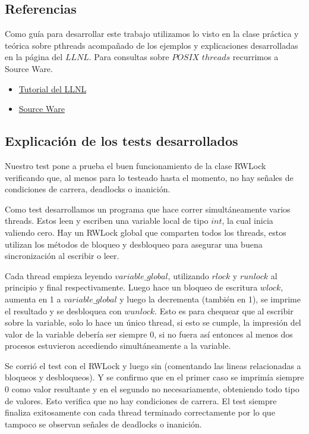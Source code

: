 \subsection{Referencias}

Como guía para desarrollar este trabajo utilizamos lo visto en la clase práctica y teórica sobre pthreads acompañado de los ejemplos y explicaciones desarrolladas en la página del $LLNL$. Para consultas sobre $POSIX$ $threads$ recurrimos a Source Ware.

\begin{itemize}

\item \href{https://computing.llnl.gov/tutorials/pthreads/}{Tutorial del LLNL}

\item \href{https://www.sourceware.org/pthreads-win32/manual/}{Source Ware}

\end{itemize}

\subsection{Explicación de los tests desarrollados}

Nuestro test pone a prueba el buen funcionamiento de la clase RWLock verificando que, al menos para lo testeado hasta el momento, no hay señales de condiciones de carrera, deadlocks o inanición. 

Como test desarrollamos un programa que hace correr simultáneamente varios threads. Estos leen y escriben una variable local de tipo $int$, la cual inicia valiendo cero. Hay un RWLock global que comparten todos los threads, estos utilizan los métodos de bloqueo y desbloqueo para asegurar una buena sincronización al escribir o leer.

Cada thread empieza leyendo $variable\_global$, utilizando $rlock$ y $runlock$ al principio y final respectivamente. Luego hace un bloqueo de escritura $wlock$, aumenta en 1 a $variable\_global$ y luego la decrementa (también en 1), se imprime el resultado y se desbloquea con $wunlock$. Esto es para chequear que al escribir sobre la variable, solo lo hace un único thread, si esto se cumple, la impresión del valor de la variable debería ser siempre $0$, si no fuera así entonces al menos dos procesos estuvieron accediendo simultáneamente a la variable.

Se corrió el test con el RWLock y luego sin (comentando las lineas relacionadas a bloqueos y desbloqueos). Y se confirmo que en el primer caso se imprimía siempre 0 como valor resultante y en el segundo no necesariamente, obteniendo todo tipo de valores. Esto verifica que no hay condiciones de carrera. El test siempre finaliza exitosamente con cada thread terminado correctamente por lo que tampoco se observan señales de deadlocks o inanición.
